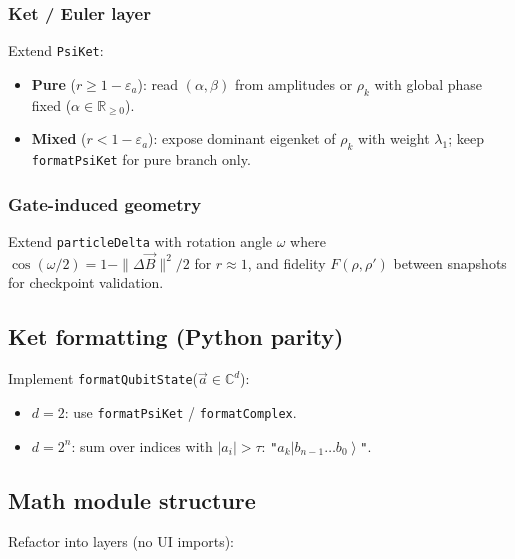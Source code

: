 \documentclass[11pt,a4paper]{article}
\newcommand{\C}{\mathbb{C}}
\newcommand{\R}{\mathbb{R}}
\newcommand{\ket}[1]{\left|#1\right\rangle}
\begin{document}
\subsubsection{Ket / Euler layer}

Extend \texttt{PsiKet}:
\begin{itemize}
  \item \textbf{Pure} ($r\ge 1-\varepsilon_a$): read $(\alpha,\beta)$ from amplitudes or $\rho_k$ with global phase fixed ($\alpha\in\R_{\ge 0}$).
  \item \textbf{Mixed} ($r<1-\varepsilon_a$): expose dominant eigenket of $\rho_k$ with weight $\lambda_1$; keep \texttt{formatPsiKet} for pure branch only.
\end{itemize}

\subsubsection{Gate-induced geometry}

Extend \texttt{particleDelta} with rotation angle $\omega$ where $\cos(\omega/2)=1-\|\Delta\vec{B}\|^2/2$ for $r\approx 1$, and fidelity $F(\rho,\rho')$ between snapshots for checkpoint validation.

\subsection{Ket formatting (Python parity)}

Implement \texttt{formatQubitState}($\vec{a}\in\C^d$):
\begin{itemize}
  \item $d=2$: use \texttt{formatPsiKet} / \texttt{formatComplex}.
  \item $d=2^n$: sum over indices with $|a_i|>\tau$: \texttt{"$a_k\ket{b_{n-1}\ldots b_0}$"}.
\end{itemize}

\subsection{Math module structure}

Refactor into layers (no UI imports):
\end{document}
